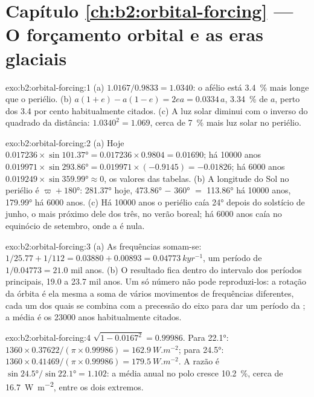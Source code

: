 \section*{Capítulo \ref{ch:b2:orbital-forcing} --- O forçamento orbital e as eras glaciais}

\begin{solution}{exo:b2:orbital-forcing:1}
(a) $1.0167/0.9833 = 1.0340$: o afélio está \qty{3.4}{\percent} mais longe que o periélio.
(b) $a(1 + e) - a(1 - e) = 2ea = 0.0334\,a$, \qty{3.34}{\percent} de $a$, perto dos 3.4 por cento
habitualmente citados. (c) A luz solar diminui com o inverso do quadrado da distância: $1.0340^2 = 1.069$,
cerca de \qty{7}{\percent} mais luz solar no periélio.
\end{solution}

\begin{solution}{exo:b2:orbital-forcing:2}
(a) Hoje $0.017236 \times \sin\ang{101.37} = 0.017236 \times 0.9804 = 0.01690$; há \num{10000} anos
$0.019971 \times \sin\ang{293.86} = 0.019971 \times (-0.9145) = -0.01826$; há \num{6000} anos
$0.019249 \times \sin\ang{359.99} \approx 0$, os valores das tabelas. (b) A longitude do Sol no
periélio é $\varpi + \ang{180}$: \ang{281.37} hoje, \ang{473.86} $-$ \ang{360} $=$ \ang{113.86}
há \num{10000} anos, \ang{179.99} há \num{6000} anos. (c) Há \num{10000} anos o periélio
caía \ang{24} depois do solstício de junho, o mais próximo dele dos três, no verão boreal;
há \num{6000} anos caía no equinócio de setembro, onde a  é nula.
\end{solution}

\begin{solution}{exo:b2:orbital-forcing:3}
(a) As frequências somam-se: $1/25.77 + 1/112 = 0.03880 + 0.00893 = \qty{0.04773}{kyr^{-1}}$, um período
de $1/0.04773 = 21.0$ mil anos. (b) O resultado fica dentro do intervalo dos períodos principais,
19.0 a 23.7 mil anos. Um só número não pode reproduzi-los: a rotação da órbita
é ela mesma a soma de vários movimentos de frequências diferentes, cada um dos quais se combina com a
precessão do eixo para dar um período da ; a média é os
\num{23000} anos habitualmente citados.
\end{solution}

\begin{solution}{exo:b2:orbital-forcing:4}
$\sqrt{1 - 0.0167^2} = 0.99986$. Para \ang{22.1}: $1360 \times 0.37622/(\pi \times 0.99986) =
\qty{162.9}{W.m^{-2}}$; para \ang{24.5}: $1360 \times 0.41469/(\pi \times 0.99986) =
\qty{179.5}{W.m^{-2}}$. A razão é $\sin\ang{24.5}/\sin\ang{22.1} = 1.102$: a média anual no
polo cresce \qty{10.2}{\percent}, cerca de \qty{16.7}{W.m^{-2}}, entre os dois extremos.
\end{solution}

